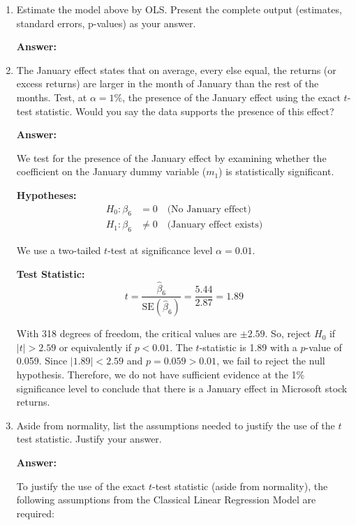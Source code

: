 \documentclass[12pt,a4paper]{article}
\begin{document}
\begin{enumerate}[label=(\alph*)]
  \item Estimate the model above by OLS. Present the complete output (estimates, standard errors, p-values) as your answer.
  
  \textbf{Answer:} 

  
  
  \item The January effect states that on average, every else equal, the returns (or excess returns) are larger in the month of January than the rest of the months. Test, at $\alpha = 1\%$, the presence of the January effect using the exact $t$-test statistic. Would you say the data supports the presence of this effect?
  
  \textbf{Answer:} 

  We test for the presence of the January effect by examining whether the coefficient on the January dummy variable ($m_1$) is statistically significant.

  \textbf{Hypotheses:}
  \begin{align*}
      H_0: \beta_6 &= 0 \quad \text{(No January effect)} \\
      H_1: \beta_6 &\neq 0 \quad \text{(January effect exists)}
  \end{align*}

  We use a two-tailed $t$-test at significance level $\alpha = 0.01$.

    \textbf{Test Statistic:}
      \[
          t = \frac{\hat{\beta}_6}{\text{SE}(\hat{\beta}_6)} = \frac{5.44}{2.87} = 1.89
      \]

  With 318 degrees of freedom, the critical values are $\pm 2.59$. So, reject $H_0$ if $|t| > 2.59$ or equivalently if $p < 0.01$.
  The $t$-statistic is 1.89 with a $p$-value of 0.059. Since $|1.89| < 2.59$ and $p = 0.059 > 0.01$, we fail to reject the null hypothesis.
  Therefore, we do not have sufficient evidence at the 1\% significance level to conclude that there is a January effect in Microsoft stock returns.
  
  \item Aside from normality, list the assumptions needed to justify the use of the $t$ test statistic. Justify your answer.
  
  \textbf{Answer:} 

    To justify the use of the exact $t$-test statistic (aside from normality), the following assumptions from the Classical Linear Regression Model are required:


\end{enumerate}
\end{document}

